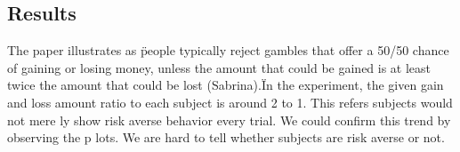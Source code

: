 \subsection {Results}
The paper illustrates as \"people typically reject gambles that offer 
a 50/50 chance of gaining or losing money, unless the amount that could be gained is at 
least twice the amount that could be lost (Sabrina).\" In the experiment, the given gain 
and loss amount ratio to each subject is around 2 to 1. This refers subjects would not mere
ly show risk averse behavior every trial. We could confirm this trend by observing the p
lots. We are hard to tell whether subjects are risk averse or not.





